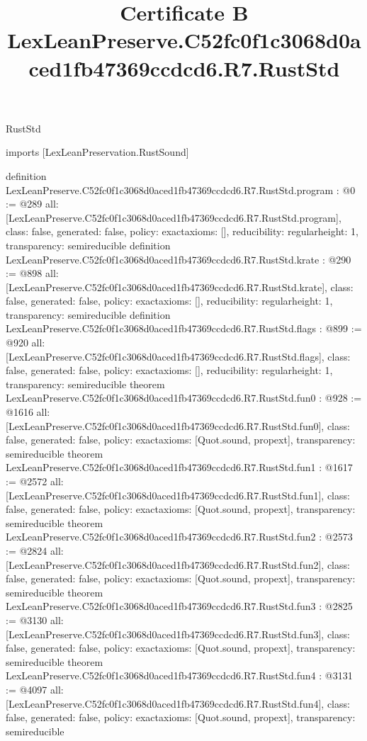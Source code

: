 \begin{lexlean}{RustStd}
\title{Certificate B LexLeanPreserve.C52fc0f1c3068d0aced1fb47369ccdcd6.R7.RustStd}
\begin{coremodule}
imports [LexLeanPreservation.RustSound]

definition LexLeanPreserve.C52fc0f1c3068d0aced1fb47369ccdcd6.R7.RustStd.program : @0 := @289 {
  all: [LexLeanPreserve.C52fc0f1c3068d0aced1fb47369ccdcd6.R7.RustStd.program],
  class: false,
  generated: false,
  policy: exact{axioms: []},
  reducibility: regular{height: 1},
  transparency: semireducible
}
definition LexLeanPreserve.C52fc0f1c3068d0aced1fb47369ccdcd6.R7.RustStd.krate : @290 := @898 {
  all: [LexLeanPreserve.C52fc0f1c3068d0aced1fb47369ccdcd6.R7.RustStd.krate],
  class: false,
  generated: false,
  policy: exact{axioms: []},
  reducibility: regular{height: 1},
  transparency: semireducible
}
definition LexLeanPreserve.C52fc0f1c3068d0aced1fb47369ccdcd6.R7.RustStd.flags : @899 := @920 {
  all: [LexLeanPreserve.C52fc0f1c3068d0aced1fb47369ccdcd6.R7.RustStd.flags],
  class: false,
  generated: false,
  policy: exact{axioms: []},
  reducibility: regular{height: 1},
  transparency: semireducible
}
theorem LexLeanPreserve.C52fc0f1c3068d0aced1fb47369ccdcd6.R7.RustStd.fun0 : @928 := @1616 {
  all: [LexLeanPreserve.C52fc0f1c3068d0aced1fb47369ccdcd6.R7.RustStd.fun0],
  class: false,
  generated: false,
  policy: exact{axioms: [Quot.sound, propext]},
  transparency: semireducible
}
theorem LexLeanPreserve.C52fc0f1c3068d0aced1fb47369ccdcd6.R7.RustStd.fun1 : @1617 := @2572 {
  all: [LexLeanPreserve.C52fc0f1c3068d0aced1fb47369ccdcd6.R7.RustStd.fun1],
  class: false,
  generated: false,
  policy: exact{axioms: [Quot.sound, propext]},
  transparency: semireducible
}
theorem LexLeanPreserve.C52fc0f1c3068d0aced1fb47369ccdcd6.R7.RustStd.fun2 : @2573 := @2824 {
  all: [LexLeanPreserve.C52fc0f1c3068d0aced1fb47369ccdcd6.R7.RustStd.fun2],
  class: false,
  generated: false,
  policy: exact{axioms: [Quot.sound, propext]},
  transparency: semireducible
}
theorem LexLeanPreserve.C52fc0f1c3068d0aced1fb47369ccdcd6.R7.RustStd.fun3 : @2825 := @3130 {
  all: [LexLeanPreserve.C52fc0f1c3068d0aced1fb47369ccdcd6.R7.RustStd.fun3],
  class: false,
  generated: false,
  policy: exact{axioms: [Quot.sound, propext]},
  transparency: semireducible
}
theorem LexLeanPreserve.C52fc0f1c3068d0aced1fb47369ccdcd6.R7.RustStd.fun4 : @3131 := @4097 {
  all: [LexLeanPreserve.C52fc0f1c3068d0aced1fb47369ccdcd6.R7.RustStd.fun4],
  class: false,
  generated: false,
  policy: exact{axioms: [Quot.sound, propext]},
  transparency: semireducible
}
\end{coremodule}
\end{lexlean}
